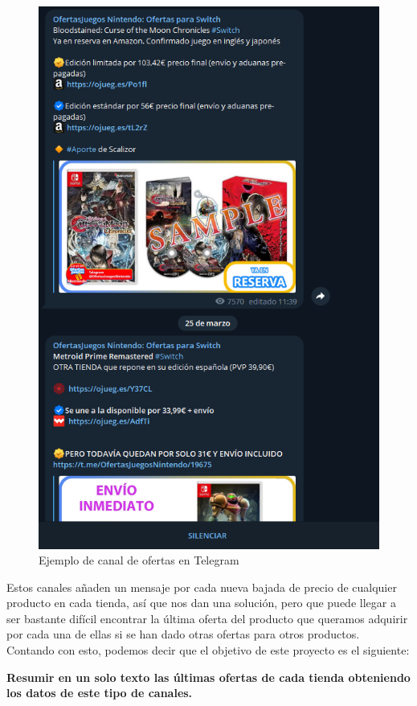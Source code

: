 \begin{figure}[H]
    \centering
    \includegraphics[scale=0.3]{img/canal_telegram_ofertas}
    \caption{Ejemplo de canal de ofertas en Telegram}
    \label{fig:canal_telegram_ofertas}
\end{figure}

Estos canales añaden un mensaje por cada nueva bajada de precio de cualquier producto en cada tienda, así que nos dan una solución,
pero que puede llegar a ser bastante difícil encontrar la última oferta del producto que queramos adquirir por cada una de ellas 
si se han dado otras ofertas para otros productos.\\

Contando con esto, podemos decir que el objetivo de este proyecto es el siguiente:

\begin{center}
    \textbf{Resumir en un solo texto las últimas ofertas de cada tienda obteniendo los datos de este tipo de canales.}\\
\end{center}
